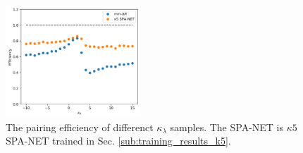 \documentclass[12pt]{article}
\begin{document}
	\begin{figure}[htpb]
		\centering
		\includegraphics[width=0.45\textwidth]{pairing_efficiency_kappa-k5.png}
		\caption{The pairing efficiency of differenct $\kappa_\lambda $ samples. The SPA-NET is $\kappa 5 $ SPA-NET trained in Sec. \ref{sub:training_results_k5}.}
		\label{fig:pairing_efficiency_kappa-k5}
	\end{figure}
\end{document}

